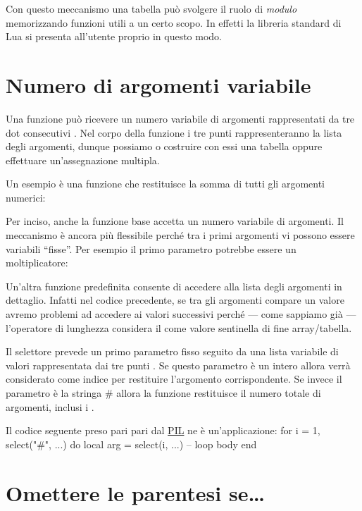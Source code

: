 Con questo meccanismo una tabella può svolgere il ruolo di \emph{modulo}
memorizzando funzioni utili a un certo scopo. In effetti la libreria standard
di Lua si presenta all'utente proprio in questo modo.



\section{Numero di argomenti variabile}

Una funzione può ricevere un numero variabile di argomenti rappresentati da tre
dot consecutivi . Nel corpo della funzione i tre punti
rappresenteranno la lista degli argomenti, dunque possiamo o costruire con essi
una tabella oppure effettuare un'assegnazione multipla.

Un esempio è una funzione che restituisce la somma di tutti gli argomenti
numerici:

Per inciso, anche la funzione base  accetta un numero variabile di
argomenti. Il meccanismo è ancora più flessibile perché tra i primi argomenti
vi possono essere variabili ``fisse''. Per esempio il primo parametro potrebbe
essere un moltiplicatore:

Un'altra funzione predefinita  consente di accedere alla lista degli
argomenti in dettaglio. Infatti nel codice precedente, se tra gli argomenti
compare un valore  avremo problemi ad accedere ai valori successivi
perché --- come sappiamo già --- l'operatore di lunghezza \key{\#} considera il
 come valore sentinella di fine array/tabella.

Il selettore prevede un primo parametro fisso seguito da una lista variabile di
valori rappresentata dai tre punti . Se questo parametro è un intero
allora verrà considerato come indice per restituire l'argomento corrispondente.
Se invece il parametro è la stringa \key\# allora la funzione restituisce il
numero totale di argomenti, inclusi i .

Il codice seguente preso pari pari dal \href{http://www.lua.org/pil/}{PIL} ne è
un'applicazione:
\lines
for i = 1, select("#", ...) do
    local arg = select(i, ...)
    -- loop body
end
\endlines
{}


\section{Omettere le parentesi se\dots}

